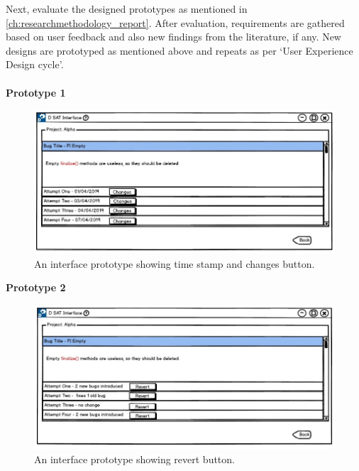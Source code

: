 Next, evaluate the designed prototypes as mentioned in \autoref{ch:researchmethodology_report}. After evaluation, requirements are gathered based on user feedback and also new findings from the literature, if any. New designs are prototyped as mentioned above and repeats as per ‘User Experience Design cycle’. \\ \\

\textbf{Prototype 1}
\begin{figure}[hbt!]
	\centering
	\includegraphics[width=\linewidth]{figures/d_changes}
	\caption{An interface prototype showing time stamp and changes button.}
	\label{fig:d_changes}
\end{figure}

\textbf{Prototype 2}
\begin{figure}[hbt!]
	\centering
	\includegraphics[width=\linewidth]{figures/d_revert}
	\caption{An interface prototype showing revert button.}
	\label{fig:d_revert}
\end{figure}

\let\cleardoublepage\clearpage


	
